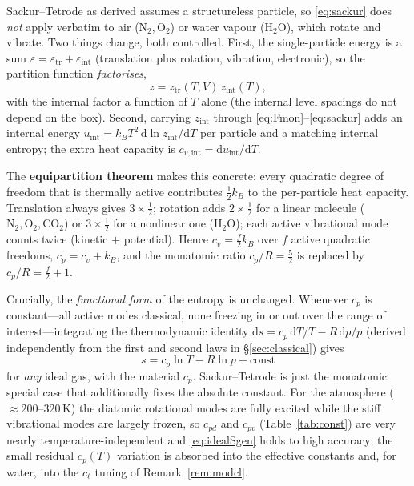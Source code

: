 \documentclass[11pt,a4paper]{article}
\theoremstyle{definition}
\newcommand{\K}{\,\mathrm{K}}
\newcommand{\cpd}{c_{pd}}
\newcommand{\cpv}{c_{pv}}
\newcommand{\cl}{c_\ell}
\newcommand{\dd}{\mathrm{d}}
\begin{document}
Sackur--Tetrode as derived assumes a structureless particle, so
\eqref{eq:sackur} does \emph{not} apply verbatim to air ($\mathrm N_2,\mathrm
O_2$) or water vapour ($\mathrm H_2\mathrm O$), which rotate and vibrate. Two
things change, both controlled. First, the single-particle energy is a sum
$\varepsilon=\varepsilon_{\mathrm{tr}}+\varepsilon_{\mathrm{int}}$
(translation plus rotation, vibration, electronic), so the partition function
\emph{factorises},
\begin{equation}\label{eq:zfactor}
z=z_{\mathrm{tr}}(T,V)\,z_{\mathrm{int}}(T),
\end{equation}
with the internal factor a function of $T$ alone (the internal level spacings do
not depend on the box). Second, carrying $z_{\mathrm{int}}$ through
\eqref{eq:Fmon}--\eqref{eq:sackur} adds an internal energy
$u_{\mathrm{int}}=k_BT^{2}\,\dd\ln z_{\mathrm{int}}/\dd T$ per particle and a
matching internal entropy; the extra heat capacity is
$c_{v,\mathrm{int}}=\dd u_{\mathrm{int}}/\dd T$.

The \textbf{equipartition theorem} makes this concrete: every quadratic degree
of freedom that is thermally active contributes $\tfrac12 k_B$ to the
per-particle heat capacity. Translation always gives $3\times\tfrac12$;
rotation adds $2\times\tfrac12$ for a linear molecule ($\mathrm N_2,\mathrm
O_2,\mathrm{CO}_2$) or $3\times\tfrac12$ for a nonlinear one ($\mathrm H_2\mathrm
O$); each active vibrational mode counts twice (kinetic $+$ potential). Hence
$c_v=\tfrac{f}{2}k_B$ over $f$ active quadratic freedoms, $c_p=c_v+k_B$, and the
monatomic ratio $c_p/R=\tfrac52$ is replaced by $c_p/R=\tfrac{f}{2}+1$.

Crucially, the \emph{functional form} of the entropy is unchanged. Whenever
$c_p$ is constant---all active modes classical, none freezing in or out over the
range of interest---integrating the thermodynamic identity
$\dd s=c_p\,\dd T/T-R\,\dd p/p$ (derived independently from the first and second
laws in \S\ref{sec:classical}) gives
\begin{equation}\label{eq:idealSgen}
s=c_p\ln T-R\ln p+\mathrm{const}
\end{equation}
for \emph{any} ideal gas, with the material $c_p$. Sackur--Tetrode is just the
monatomic special case that additionally fixes the absolute constant. For the
atmosphere ($\approx\!200$--$320\K$) the diatomic rotational modes are fully
excited while the stiff vibrational modes are largely frozen, so $\cpd$ and
$\cpv$ (Table~\ref{tab:const}) are very nearly temperature-independent and
\eqref{eq:idealSgen} holds to high accuracy; the small residual $c_p(T)$
variation is absorbed into the effective constants and, for water, into the
$\cl$ tuning of Remark~\ref{rem:modcl}.
\end{document}
